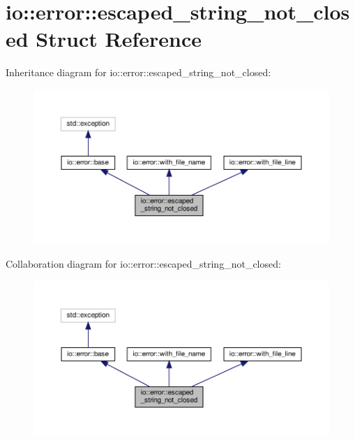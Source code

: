 \hypertarget{structio_1_1error_1_1escaped__string__not__closed}{}\section{io\+:\+:error\+:\+:escaped\+\_\+string\+\_\+not\+\_\+closed Struct Reference}
\label{structio_1_1error_1_1escaped__string__not__closed}


Inheritance diagram for io\+:\+:error\+:\+:escaped\+\_\+string\+\_\+not\+\_\+closed\+:\nopagebreak
\begin{figure}[H]
\begin{center}
\leavevmode
\includegraphics[width=350pt]{structio_1_1error_1_1escaped__string__not__closed__inherit__graph}
\end{center}
\end{figure}


Collaboration diagram for io\+:\+:error\+:\+:escaped\+\_\+string\+\_\+not\+\_\+closed\+:\nopagebreak
\begin{figure}[H]
\begin{center}
\leavevmode
\includegraphics[width=350pt]{structio_1_1error_1_1escaped__string__not__closed__coll__graph}
\end{center}
\end{figure}
